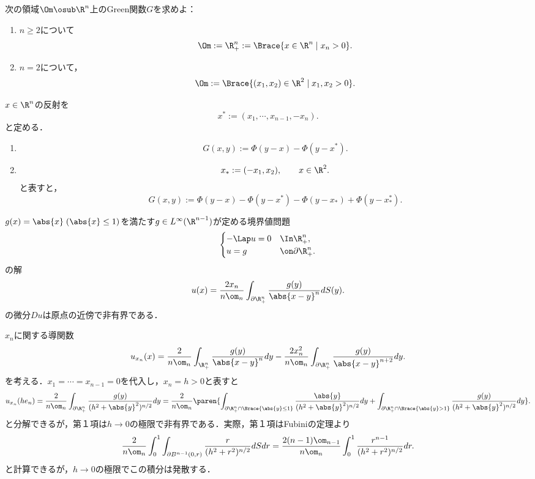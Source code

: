 \documentclass[uplatex,dvipdfmx]{jsarticle}
\begin{document}
\begin{problem}[Green関数を求め方]
    次の領域$\Om\osub\R^n$上のGreen関数$G$を求めよ：
    \begin{enumerate}
        \item $n\ge2$について
        \[\Om:=\R^n_+:=\Brace{x\in\R^n\mid x_n>0}.\]
        \item $n=2$について，
        \[\Om:=\Brace{(x_1,x_2)\in\R^2\mid x_1,x_2>0}.\]
    \end{enumerate}
\end{problem}
\begin{Proof}
    $x\in\R^n$の反射を
    \[x^*:=(x_1,\cdots,x_{n-1},-x_n).\]
    と定める．
    \begin{enumerate}
        \item \[G(x,y):=\Phi(y-x)-\Phi(y-x^*).\]
        \item 
        \[x_*:=(-x_1,x_2),\qquad x\in\R^2.\]
        と表すと，
        \[G(x,y):=\Phi(y-x)-\Phi(y-x^*)-\Phi(y-x_*)+\Phi(y-x^*_*).\]
    \end{enumerate}
\end{Proof}

\begin{problem}[上半平面上のPoisson核]
    $g(x)=\abs{x}\;(\abs{x}\le1)$を満たす$g\in L^\infty(\R^{n-1})$が定める境界値問題
    \[\begin{cases}
        -\Lap u=0&\In\R^n_+,\\
        u=g&\on\partial\R^n_+.
    \end{cases}\]
    の解
    \[u(x)=\frac{2x_n}{n\om_n}\int_{\partial\R^n_+}\frac{g(y)}{\abs{x-y}^n}dS(y).\]
    の微分$Du$は原点の近傍で非有界である．
\end{problem}
\begin{Proof}
    $x_n$に関する導関数
    \[u_{x_n}(x)=\frac{2}{n\om_n}\int_{\R^n_+}\frac{g(y)}{\abs{x-y}^n}dy-\frac{2x_n^2}{n\om_n}\int_{\partial\R^n_+}\frac{g(y)}{\abs{x-y}^{n+2}}dy.\]
    を考える．$x_1=\cdots=x_{n-1}=0$を代入し，$x_n=h>0$と表すと
    \[u_{x_n}(he_n)=\frac{2}{n\om_n}\int_{\partial\R^n_+}\frac{g(y)}{(h^2+\abs{y}^2)^{n/2}}dy=\frac{2}{n\om_n}\paren{\int_{\partial\R^n_+\cap\Brace{\abs{y}\le1}}\frac{\abs{y}}{(h^2+\abs{y}^2)^{n/2}}dy+\int_{\partial\R^n_+\cap\Brace{\abs{y}>1}}\frac{g(y)}{(h^2+\abs{y}^2)^{n/2}}dy}.\]
    と分解できるが，第１項は$h\to0$の極限で非有界である．実際，第１項はFubiniの定理より
    \[\frac{2}{n\om_n}\int^1_0\int_{\partial B^{n-1}(0,r)}\frac{r}{(h^2+r^2)^{n/2}}dSdr=\frac{2(n-1)\om_{n-1}}{n\om_n}\int^1_0\frac{r^{n-1}}{(h^2+r^2)^{n/2}}dr.\]
    と計算できるが，$h\to0$の極限でこの積分は発散する．
\end{Proof}
\end{document}
